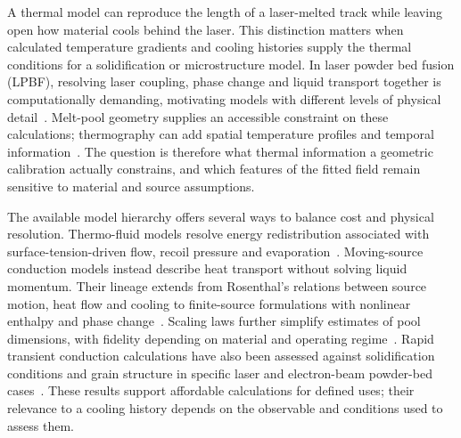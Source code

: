 A thermal model can reproduce the length of a laser-melted track while leaving open how material cools behind the laser. This distinction matters when calculated temperature gradients and cooling histories supply the thermal conditions for a solidification or microstructure model. In laser powder bed fusion (LPBF), resolving laser coupling, phase change and liquid transport together is computationally demanding, motivating models with different levels of physical detail~\cite{king2015,review2024}. Melt-pool geometry supplies an accessible constraint on these calculations; thermography can add spatial temperature profiles and temporal information~\cite{hooper2018,myers2023}. The question is therefore what thermal information a geometric calibration actually constrains, and which features of the fitted field remain sensitive to material and source assumptions.

The available model hierarchy offers several ways to balance cost and physical resolution. Thermo-fluid models resolve energy redistribution associated with surface-tension-driven flow, recoil pressure and evaporation~\cite{khairallah2016}. Moving-source conduction models instead describe heat transport without solving liquid momentum. Their lineage extends from Rosenthal's relations between source motion, heat flow and cooling to finite-source formulations with nonlinear enthalpy and phase change~\cite{rosenthal1946,vanelsen2007}. Scaling laws further simplify estimates of pool dimensions, with fidelity depending on material and operating regime~\cite{rubenchik2018,naderi2023}. Rapid transient conduction calculations have also been assessed against solidification conditions and grain structure in specific laser and electron-beam powder-bed cases~\cite{Plotkowski2017Rapid}. These results support affordable calculations for defined uses; their relevance to a cooling history depends on the observable and conditions used to assess them.

